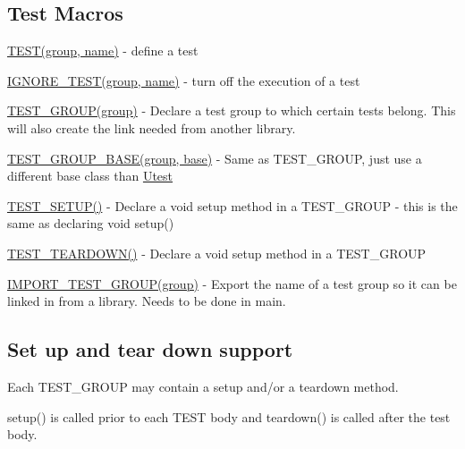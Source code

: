 \subsection*{Test Macros}


\begin{DoxyItemize}
\item \hyperlink{_utest_macros_8h_a13fb650bc56807117ccc8c53d4c957c9}{T\+E\+S\+T(group, name)} -\/ define a test
\item \hyperlink{_utest_macros_8h_aa11fb982f62c73d1fd75103b428c3213}{I\+G\+N\+O\+R\+E\+\_\+\+T\+E\+S\+T(group, name)} -\/ turn off the execution of a test
\item \hyperlink{_utest_macros_8h_a109b3c7ca51a87da0abc0a229663d7fd}{T\+E\+S\+T\+\_\+\+G\+R\+O\+U\+P(group)} -\/ Declare a test group to which certain tests belong. This will also create the link needed from another library.
\item \hyperlink{_utest_macros_8h_a6fc66592d3cf110552a1c2a896ece04d}{T\+E\+S\+T\+\_\+\+G\+R\+O\+U\+P\+\_\+\+B\+A\+S\+E(group, base)} -\/ Same as T\+E\+S\+T\+\_\+\+G\+R\+O\+UP, just use a different base class than \hyperlink{class_utest}{Utest}
\item \hyperlink{_utest_macros_8h_abb5b7b11b5ba4cbee48b5ba704eaf322}{T\+E\+S\+T\+\_\+\+S\+E\+T\+U\+P()} -\/ Declare a void setup method in a T\+E\+S\+T\+\_\+\+G\+R\+O\+UP -\/ this is the same as declaring void setup()
\item \hyperlink{_utest_macros_8h_a87441b01f60d9bdae8f0a74b9c429a56}{T\+E\+S\+T\+\_\+\+T\+E\+A\+R\+D\+O\+W\+N()} -\/ Declare a void setup method in a T\+E\+S\+T\+\_\+\+G\+R\+O\+UP
\item \hyperlink{_utest_macros_8h_a54a7b59102557310a5b8fe7e26a7045e}{I\+M\+P\+O\+R\+T\+\_\+\+T\+E\+S\+T\+\_\+\+G\+R\+O\+U\+P(group)} -\/ Export the name of a test group so it can be linked in from a library. Needs to be done in main.
\end{DoxyItemize}

\subsection*{Set up and tear down support}


\begin{DoxyItemize}
\item Each T\+E\+S\+T\+\_\+\+G\+R\+O\+UP may contain a setup and/or a teardown method.
\item setup() is called prior to each T\+E\+ST body and teardown() is called after the test body.
\end{DoxyItemize}

